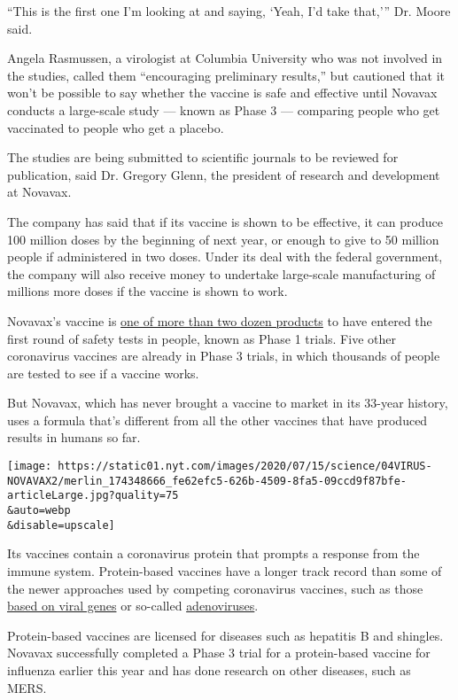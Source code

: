 ``This is the first one I'm looking at and saying, `Yeah, I'd take
that,''' Dr. Moore said.

Angela Rasmussen, a virologist at Columbia University who was not
involved in the studies, called them ``encouraging preliminary
results,'' but cautioned that it won't be possible to say whether the
vaccine is safe and effective until Novavax conducts a large-scale study
--- known as Phase 3 --- comparing people who get vaccinated to people
who get a placebo.

The studies are being submitted to scientific journals to be reviewed
for publication, said Dr. Gregory Glenn, the president of research and
development at Novavax.

The company has said that if its vaccine is shown to be effective, it
can produce 100 million doses by the beginning of next year, or enough
to give to 50 million people if administered in two doses. Under its
deal with the federal government, the company will also receive money to
undertake large-scale manufacturing of millions more doses if the
vaccine is shown to work.

Novavax's vaccine is
\href{https://www.nytimes.com/interactive/2020/science/coronavirus-vaccine-tracker.html}{one
of more than two dozen products} to have entered the first round of
safety tests in people, known as Phase 1 trials. Five other coronavirus
vaccines are already in Phase 3 trials, in which thousands of people are
tested to see if a vaccine works.

But Novavax, which has never brought a vaccine to market in its 33-year
history, uses a formula that's different from all the other vaccines
that have produced results in humans so far.

\texttt{[image: https://static01.nyt.com/images/2020/07/15/science/04VIRUS-NOVAVAX2/merlin\_174348666\_fe62efc5-626b-4509-8fa5-09ccd9f87bfe-articleLarge.jpg?quality=75\\\&auto=webp\\\&disable=upscale]}

Its vaccines contain a coronavirus protein that prompts a response from
the immune system. Protein-based vaccines have a longer track record
than some of the newer approaches used by competing coronavirus
vaccines, such as those
\href{https://www.nytimes.com/2020/07/28/health/coronavirus-moderna-vaccine-monkeys.html}{based
on viral genes} or so-called
\href{https://www.nytimes.com/2020/07/20/world/covid-coronavirus-vaccine.html}{adenoviruses}.

Protein-based vaccines are licensed for diseases such as hepatitis B and
shingles. Novavax successfully completed a Phase 3 trial for a
protein-based vaccine for influenza earlier this year and has done
research on other diseases, such as MERS.

